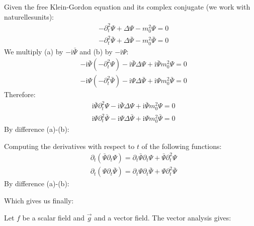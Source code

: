 	Given the free Klein-Gordon equation and its complex conjugate (we work with naturellesunits):
	\begin{subequations}
	\label{equations}
	\begin{align}
	  \label{eq:a}
	  &-\partial_t^2\Psi+\Delta \Psi-m_0^2\Psi=0 \\
	  \label{eq:b}
	  &-\partial_t^2\bar{\Psi}+\Delta \bar{\Psi}-m_0^2\bar{\Psi}=0
	\end{align}
	\end{subequations}
	We multiply (a) by $-\mathrm{i}\bar{\Psi}$ and (b) by $-\mathrm{i}\Psi$:
	\begin{subequations}
	\label{equations}
	\begin{align}
	  \label{eq:a}
	  &-\mathrm{i}\bar{\Psi}\left(-\partial_t^2\Psi\right)-\mathrm{i}\bar{\Psi}\Delta \Psi+\mathrm{i}\bar{\Psi}m_0^2\Psi=0 \\
	  \label{eq:b}
	  &-\mathrm{i}\Psi\left(-\partial_t^2\bar{\Psi}\right)-\mathrm{i}\Psi\Delta \bar{\Psi}+\mathrm{i}\Psi m_0^2\bar{\Psi}=0
	\end{align}
	\end{subequations}
	Therefore:
	\begin{subequations}
	\label{equations}
	\begin{align}
	  \label{eq:a}
	  &\mathrm{i}\bar{\Psi}\partial_t^2\Psi-\mathrm{i}\bar{\Psi}\Delta \Psi+\mathrm{i}\bar{\Psi}m_0^2\Psi=0 \\
	  \label{eq:b}
	  &\mathrm{i}\Psi\partial_t^2\bar{\Psi}-\mathrm{i}\Psi\Delta \bar{\Psi}+\mathrm{i}\Psi m_0^2\bar{\Psi}=0
	\end{align}
	\end{subequations}
	By difference (a)-(b):
	
	Computing the derivatives with respect to $t$ of the following functions:
	\begin{subequations}
	\label{equations}
	\begin{align}
	  \label{eq:a}
	  &\partial_t(\bar{\Psi}\partial_t\Psi)=\partial_t\bar{\Psi}\partial_t\Psi+\bar{\Psi}\partial_t^2\Psi \\
	  \label{eq:b}
	  &\partial_t(\Psi\partial_t\bar{\Psi})=\partial_t\Psi\partial_t\bar{\Psi}+\Psi\partial_t^2\bar{\Psi}
	\end{align}
	\end{subequations}
	By difference (a)-(b):
	
	Which gives us finally:
	
	Let $f$ be a scalar field and $\vec{g}$ and a vector field. The vector analysis gives:
	
